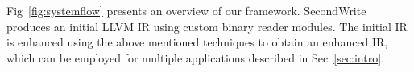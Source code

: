 


%
Fig~\ref{fig:systemflow} presents an overview of our framework. SecondWrite produces an initial LLVM IR using custom binary reader modules. The initial IR is enhanced using the above mentioned techniques to obtain an enhanced IR, which can be employed for multiple applications described in Sec~\ref{sec:intro}.


